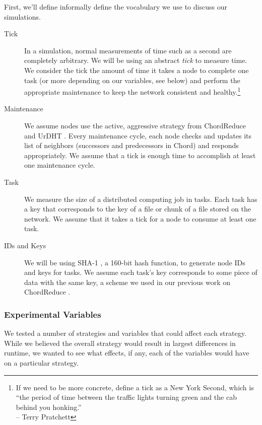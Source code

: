 First, we'll define informally define the vocabulary we use to discuss our simulations.

\begin{description}
	\item [Tick] In a simulation, normal measurements of time such as a second are completely arbitrary.  
	We will be using an abstract \textit{tick} to measure time.  
	We consider the tick the amount of time it takes a node to complete one task (or more depending on our variables, see below) and perform the appropriate maintenance to keep the network consistent and healthy.\footnote{If we need to be more concrete, define a tick as a New York Second, which is ``the period of time between the traffic lights turning green and the cab behind you honking.''\\-- Terry Pratchett}
	\item [Maintenance] We assume nodes use the active, aggressive strategy from ChordReduce and UrDHT \cite{chordreduce} \cite{urdht}.
	Every maintenance cycle, each node checks and updates its list of neighbors (successors and predecessors in Chord) and responds appropriately. 
	We assume that a tick is enough time to accomplish at least one maintenance cycle.
	\item[Task] We measure the size of a distributed computing job in tasks.
	Each task has a key that corresponds to the key of a file or chunk of a file stored on the network.
	We assume that it takes a tick for a node to consume at least one task.
	\item [IDs and Keys] 
	We will be using SHA-1 \cite{sha1}, a 160-bit hash function, to generate node IDs and keys for tasks.  
	We assume each task's key corresponds to some piece of data with the same key, a scheme we used in  our previous work on ChordReduce \cite{chordreduce}.
\end{description}

\subsubsection{Experimental Variables}
We tested a number of strategies and variables that could affect each strategy.
While we believed the overall strategy would result in largest differences in runtime, we wanted to see what effects, if any, each of the variables would have on a particular strategy.

